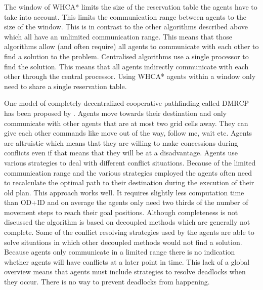 The window of WHCA* limits the size of the reservation table the agents have to
take into account. This limits the communication range between agents to the
size of the window. This is in contrast to the other algorithms described above
which all have an unlimited communication range. This means that those
algorithms allow (and often require) all agents to communicate with each other
to find a solution to the problem. Centralised algorithms use a single
processor to find the solution. This means that all agents indirectly
communicate with each other through the central processor. Using WHCA* agents
within a window only need to share a single reservation table.

One model of completely decentralized cooperative pathfinding called DMRCP has
been proposed by \cite{wei2016}. Agents move towards their destination and only
communicate with other agents that are at most two grid cells away. They can
give each other commands like
move out of the way, follow me, wait etc. Agents are altruistic which means
that they are willing to make concessions during conflicts even if that means
that they will be at a disadvantage. Agents use various strategies to deal with
different conflict situations. Because of the limited communication range and
the various strategies employed the agents often need to recalculate the
optimal path to their destination during the execution of their old plan. This
approach works well. It requires slightly less computation time than OD+ID and
on average the agents only need two thirds of the number of movement steps to
reach their goal positions. Although completeness is not discussed the
algorithm is based on decoupled methods which are generally not complete. Some
of the conflict resolving strategies used by the agents are able to solve
situations in which other decoupled methods would not find a solution.
Because agents only communicate in a limited range there is no indication
whether agents will have conflicts at a later point in time. This lack of a
global overview means that agents must include strategies to resolve deadlocks
when they occur. There is no way to prevent deadlocks from happening.

